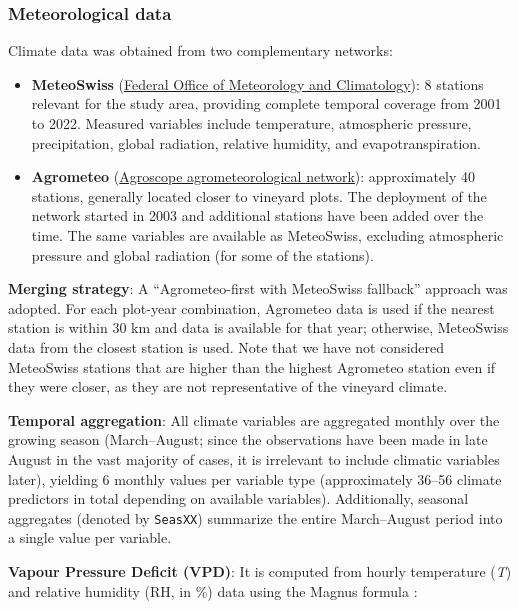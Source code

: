 \subsubsection{Meteorological data}

Climate data was obtained from two complementary networks:

\begin{itemize}
\item
  \textbf{MeteoSwiss} (\href{https://www.meteoswiss.admin.ch/}{Federal Office of Meteorology and Climatology}): 8 stations relevant for the study area, providing complete temporal coverage from 2001 to 2022. Measured variables include temperature, atmospheric pressure, precipitation, global radiation, relative humidity, and evapotranspiration.
\item
  \textbf{Agrometeo} (\href{https://www.agrometeo.ch/}{Agroscope agrometeorological network}): approximately 40 stations, generally located closer to vineyard plots. The deployment of the network started in 2003 and additional stations have been added over the time. The same variables are available as MeteoSwiss, excluding atmospheric pressure and global radiation (for some of the stations).
\end{itemize}

\textbf{Merging strategy}: A ``Agrometeo-first with MeteoSwiss fallback'' approach was adopted. For each plot-year combination, Agrometeo data is used if the nearest station is within 30 km and data is available for that year; otherwise, MeteoSwiss data from the closest station is used. Note that we have not considered MeteoSwiss stations that are higher than the highest Agrometeo station even if they were closer, as they are not representative of the vineyard climate.

\textbf{Temporal aggregation}: All climate variables are aggregated monthly over the growing season (March--August; since the observations have been made in late August in the vast majority of cases, it is irrelevant to include climatic variables later), yielding 6 monthly values per variable type (approximately 36--56 climate predictors in total depending on available variables). Additionally, seasonal aggregates (denoted by \texttt{SeasXX}) summarize the entire March--August period into a single value per variable.

\textbf{Vapour Pressure Deficit (VPD)}: It is computed from hourly temperature (\emph{T}) and relative humidity (RH, in \%) data using the Magnus formula \citep{alduchov_improved_1996}:

